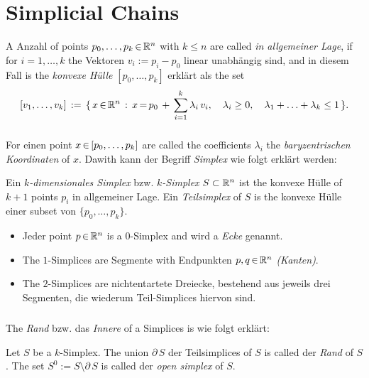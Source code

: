 \documentclass[11pt,twoside]{article}
\def\simS{S}
\begin{document}
\section{Simplicial Chains}
A Anzahl of points $p_0,\ldots,p_k {\,\in\,} {\mathbb{R}}^n$ with $k \leq n$ are called
\textit{in allgemeiner Lage},
if for $i=1,\ldots,k$ the Vektoren $v_i := p_i-p_0$ linear unabh\"angig sind,
and in diesem Fall is the \textit{konvexe H\"ulle} $[p_0,\ldots,p_k]$ erkl\"art
als the set
\[
[v_1,\ldots,v_k]
\, := \,
\{ \, x {\,\in\,} {\mathbb{R}}^n \,: \, x {\,=\,} p_0 \, + \, \sum_{i=1}^k \lambda_i \, v_i,
    \quad 
    \lambda_i \geq 0,
    \quad
    \lambda_1 + \ldots + \lambda_k \leq 1 \, \}.
\]
\subparagraph{}
For einen point $x {\,\in\,} [p_0,\ldots,p_k]$ are called the coefficients
$\lambda_i$ the \textit{baryzentrischen Koordinaten} of $x$.
Dawith kann der Begriff \textit{Simplex} wie folgt erkl\"art werden:

\begin{definition}
Ein \textit{$k$-dimensionales Simplex} bzw. \textit{$k$-Simplex} $\simS \subset \R^n$
ist the konvexe H\"ulle of $k+1$ points $p_i$ in allgemeiner Lage.
Ein \textit{Teilsimplex} of $\simS$ is the konvexe H\"ulle einer subset von
$\{ p_0,\ldots,p_k\}$.
\end{definition}

\begin{examples}
\begin{itemize}
\item
Jeder point $p {\,\in\,} {\mathbb{R}}^n$ is a $0$-Simplex and wird a \textit{Ecke} genannt.
\item
The $1$-Simplices are Segmente with Endpunkten $p,q {\,\in\,} {\mathbb{R}}^n$ \textit{(Kanten)}.
\item
The $2$-Simplices are nichtentartete Dreiecke,
bestehend aus jeweils drei Segmenten,
die wiederum Teil-Simplices hiervon sind.
\end{itemize}
\end{examples}

\subparagraph{}
The \textit{Rand} bzw. das \textit{Innere} of a Simplices is wie folgt erkl\"art:

\begin{definition}
Let $\simS$ be a $k$-Simplex.
The union $\partial \, \simS$ der Teilsimplices of $\simS$ is called der
\textit{Rand} of $\simS$.
The set $S^0 := \simS \setminus \partial \, \simS$
is called der \textit{open simplex} of $\simS$.
\end{definition}
\end{document}
